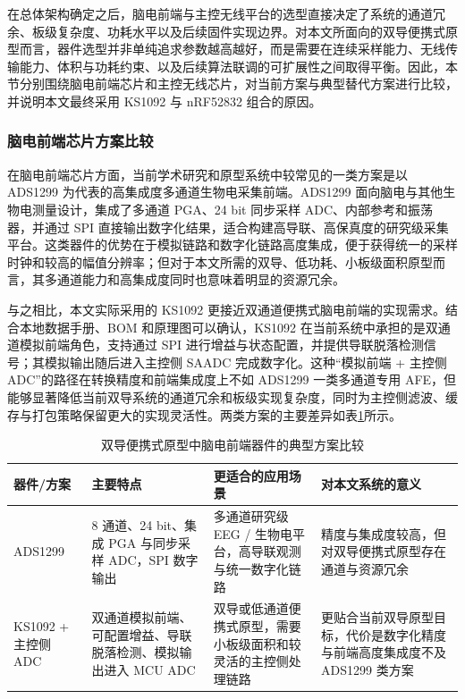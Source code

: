 在总体架构确定之后，脑电前端与主控无线平台的选型直接决定了系统的通道冗余、板级复杂度、功耗水平以及后续固件实现边界。对本文所面向的双导便携式原型而言，器件选型并非单纯追求参数越高越好，而是需要在连续采样能力、无线传输能力、体积与功耗约束、以及后续算法联调的可扩展性之间取得平衡。因此，本节分别围绕脑电前端芯片和主控无线芯片，对当前方案与典型替代方案进行比较，并说明本文最终采用 KS1092 与 nRF52832 组合的原因。

\subsubsection{脑电前端芯片方案比较}

在脑电前端芯片方面，当前学术研究和原型系统中较常见的一类方案是以 ADS1299 为代表的高集成度多通道生物电采集前端。ADS1299 面向脑电与其他生物电测量设计，集成了多通道 PGA、24 bit 同步采样 ADC、内部参考和振荡器，并通过 SPI 直接输出数字化结果，适合构建高导联、高保真度的研究级采集平台\cite{ads1299_ti}。这类器件的优势在于模拟链路和数字化链路高度集成，便于获得统一的采样时钟和较高的幅值分辨率；但对于本文所需的双导、低功耗、小板级面积原型而言，其多通道能力和高集成度同时也意味着明显的资源冗余。

与之相比，本文实际采用的 KS1092 更接近双通道便携式脑电前端的实现需求。结合本地数据手册、BOM 和原理图可以确认，KS1092 在当前系统中承担的是双通道模拟前端角色，支持通过 SPI 进行增益与状态配置，并提供导联脱落检测信号；其模拟输出随后进入主控侧 SAADC 完成数字化\cite{ks109x_datasheet}。这种“模拟前端 + 主控侧 ADC”的路径在转换精度和前端集成度上不如 ADS1299 一类多通道专用 AFE，但能够显著降低当前双导系统的通道冗余和板级实现复杂度，同时为主控侧滤波、缓存与打包策略保留更大的实现灵活性。两类方案的主要差异如表\ref{tab:c3_afe_compare}所示。

\begin{table}[htbp]
    \centering
    \caption{双导便携式原型中脑电前端器件的典型方案比较}
    \label{tab:c3_afe_compare}
    \begin{tabular}{p{2.7cm}p{3.6cm}p{3.8cm}p{4.2cm}}
        \hline
        器件/方案 & 主要特点 & 更适合的应用场景 & 对本文系统的意义 \\
        \hline
        ADS1299 & 8 通道、24 bit、集成 PGA 与同步采样 ADC，SPI 数字输出\cite{ads1299_ti} & 多通道研究级 EEG / 生物电平台，高导联观测与统一数字化链路 & 精度与集成度较高，但对双导便携式原型存在通道与资源冗余 \\
        KS1092 + 主控侧 ADC & 双通道模拟前端、可配置增益、导联脱落检测、模拟输出进入 MCU ADC\cite{ks109x_datasheet} & 双导或低通道便携式原型，需要小板级面积和较灵活的主控侧处理链路 & 更贴合当前双导原型目标，代价是数字化精度与前端高度集成度不及 ADS1299 类方案 \\
        \hline
    \end{tabular}
\end{table}

